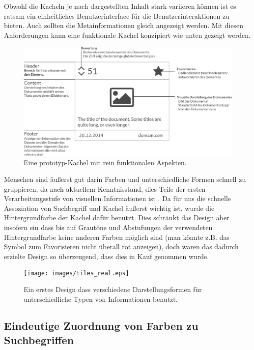 \documentclass[12pt,twoside]{book}
\begin{document}
Obwohl die Kacheln je nach dargestellten Inhalt stark variieren können ist es ratsam ein einheitliches Benutzerinterface für die Benutzerinteraktionen zu bieten. Auch sollten die Metainformationen gleich angezeigt werden.
Mit diesen Anforderungen kann eine funktionale Kachel konzipiert wie unten gezeigt werden.

\begin{figure}[H]
    \centering
    \includegraphics[width=1.0\textwidth]{images/tiles.eps}
    \caption{Eine prototyp-Kachel mit rein funktionalen Aspekten.}
    \label{fig:awesome_image}
\end{figure}

Menschen sind äußerst gut darin Farben und unterschiedliche Formen schnell zu gruppieren, da nach aktuellem Kenntnisstand, dies Teile der ersten Verarbeitungsstufe von visuellen Informationen ist \citep{treisman1987merkmale}. Da für uns die schnelle Assoziation von Suchbegriff und Kachel äußerst wichtig ist, wurde die Hintergrundfarbe der Kachel dafür benutzt. Dies schränkt das Design aber insofern ein dass bis auf Grautöne und Abstufungen der verwendeten Hintergrundfarbe keine anderen Farben möglich sind (man könnte z.B. das Symbol zum Favorisieren nicht überall rot anzeigen), doch waren das dadurch erzielte Design so überzeugend, dass dies in Kauf genommen wurde.

\begin{figure}[H]
    \centering
    \texttt{[image: images/tiles\_real.eps]}
    \caption{Ein erstes Design dass verschiedene Darstellungsformen für unterschiedliche Typen von Informationen benutzt.}
    \label{fig:awesome_image}
\end{figure}

\subsection{Eindeutige Zuordnung von Farben zu Suchbegriffen}
\end{document}
